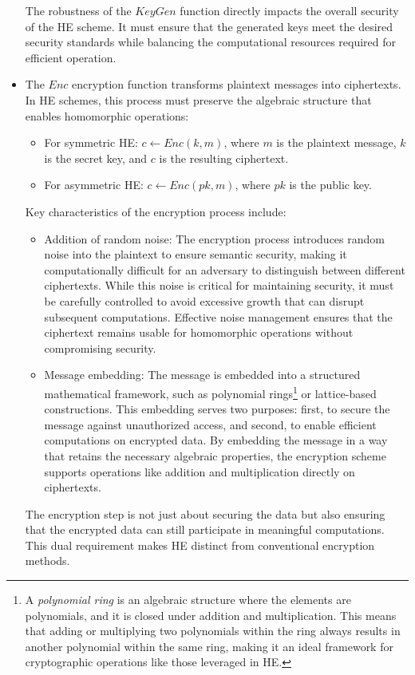 \documentclass[
  letterpaper,
  DIV=11,
  numbers=noendperiod,
  oneside]{scrartcl}
\begin{document}
\begin{itemize}
  The robustness of the \(KeyGen\) function directly impacts the overall
  security of the HE scheme. It must ensure that the generated keys meet
  the desired security standards while balancing the computational
  resources required for efficient operation.
\item
  The \(Enc\) encryption function transforms plaintext messages into
  ciphertexts. In HE schemes, this process must preserve the algebraic
  structure that enables homomorphic operations:

  \begin{itemize}
  \item
    For symmetric HE: \(c \leftarrow Enc(k, m)\), where \(m\) is the
    plaintext message, \(k\) is the secret key, and \(c\) is the
    resulting ciphertext.
  \item
    For asymmetric HE: \(c \leftarrow Enc(pk, m)\), where \(pk\) is the
    public key.
  \end{itemize}

  Key characteristics of the encryption process include:

  \begin{itemize}
  \item
    Addition of random noise: The encryption process introduces random
    noise into the plaintext to ensure semantic security, making it
    computationally difficult for an adversary to distinguish between
    different ciphertexts. While this noise is critical for maintaining
    security, it must be carefully controlled to avoid excessive growth
    that can disrupt subsequent computations. Effective noise management
    ensures that the ciphertext remains usable for homomorphic
    operations without compromising security.
  \item
    Message embedding: The message is embedded into a structured
    mathematical framework, such as polynomial rings\footnote{A
      \emph{polynomial ring} is an algebraic structure where the
      elements are polynomials, and it is closed under addition and
      multiplication. This means that adding or multiplying two
      polynomials within the ring always results in another polynomial
      within the same ring, making it an ideal framework for
      cryptographic operations like those leveraged in HE.} or
    lattice-based constructions. This embedding serves two purposes:
    first, to secure the message against unauthorized access, and
    second, to enable efficient computations on encrypted data. By
    embedding the message in a way that retains the necessary algebraic
    properties, the encryption scheme supports operations like addition
    and multiplication directly on ciphertexts.
  \end{itemize}

  The encryption step is not just about securing the data but also
  ensuring that the encrypted data can still participate in meaningful
  computations. This dual requirement makes HE distinct from
  conventional encryption methods.
\end{itemize}
\end{document}
